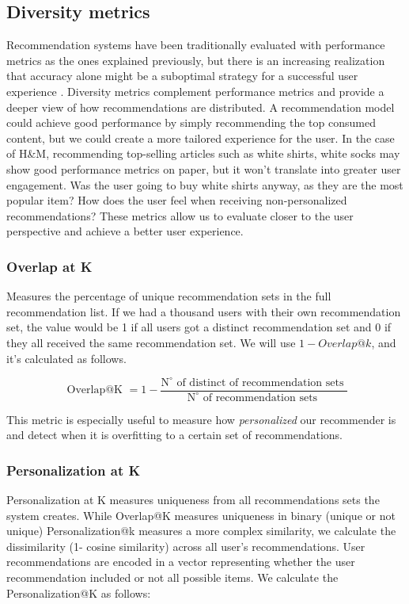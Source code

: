 \documentclass{kththesis}
\begin{document}
\subsection{Diversity metrics}
Recommendation systems have been traditionally evaluated with performance metrics as the ones explained previously, but there is an increasing realization that accuracy alone might be a suboptimal strategy for a successful user experience \cite{noveltyintro}.
Diversity metrics complement performance metrics and provide a deeper view of how recommendations are distributed. A recommendation model could achieve good performance by simply recommending the top consumed content, but we could create a more tailored experience for the user. In the case of H\&M, recommending top-selling articles such as white shirts, white socks may show good performance metrics on paper, but it won't translate into greater user engagement. Was the user going to buy white shirts anyway, as they are the most popular item? How does the user feel when receiving non-personalized recommendations? These metrics allow us to evaluate closer to the user perspective and achieve a better user experience.

\subsubsection{Overlap at K}
Measures the percentage of unique recommendation sets in the full recommendation list. If we had a thousand users with their own recommendation set, the value would be 1 if all users got a distinct recommendation set and 0 if they all received the same recommendation set. We will use $1-Overlap@k$, and it's calculated as follows. 

\begin{equation}
\text { Overlap@K }= 1 -  \frac{\mathrm{N}^{\circ} \text { of distinct of recommendation sets }}{\mathrm{N}^{\circ} \text { of recommendation sets }}
\end{equation}

This metric is especially useful to measure how \textit{personalized} our recommender is and detect when it is overfitting to a certain set of recommendations. 
\subsubsection{Personalization at K}
Personalization at K measures uniqueness from all recommendations sets the system creates. While Overlap@K measures uniqueness in binary (unique or not unique) Personalization@k measures a more complex similarity, we calculate the dissimilarity (1- cosine similarity) across all user's recommendations. User recommendations are encoded in a vector representing whether the user recommendation included or not all possible items. We calculate the Personalization@K as follows:
\end{document}
